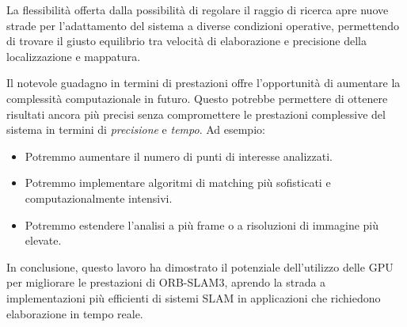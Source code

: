 \documentclass[12pt,a4paper]{report}
\begin{document}
La flessibilità offerta dalla possibilità di regolare il raggio di ricerca apre nuove strade per l'adattamento del sistema a diverse condizioni operative, permettendo di trovare il giusto equilibrio tra velocità di elaborazione e precisione della localizzazione e mappatura.

Il notevole guadagno in termini di prestazioni offre l'opportunità di aumentare la complessità computazionale in futuro. Questo potrebbe permettere di ottenere risultati ancora più precisi senza compromettere le prestazioni complessive del sistema in termini di \textit{precisione} e \textit{tempo}. Ad esempio:
\begin{itemize}
\item Potremmo aumentare il numero di punti di interesse analizzati.
\item Potremmo implementare algoritmi di matching più sofisticati e computazionalmente intensivi.
\item Potremmo estendere l'analisi a più frame o a risoluzioni di immagine più elevate.
\end{itemize}

In conclusione, questo lavoro ha dimostrato il potenziale dell'utilizzo delle GPU per migliorare le prestazioni di ORB-SLAM3, aprendo la strada a implementazioni più efficienti di sistemi SLAM in applicazioni che richiedono elaborazione in tempo reale.



\end{document}

